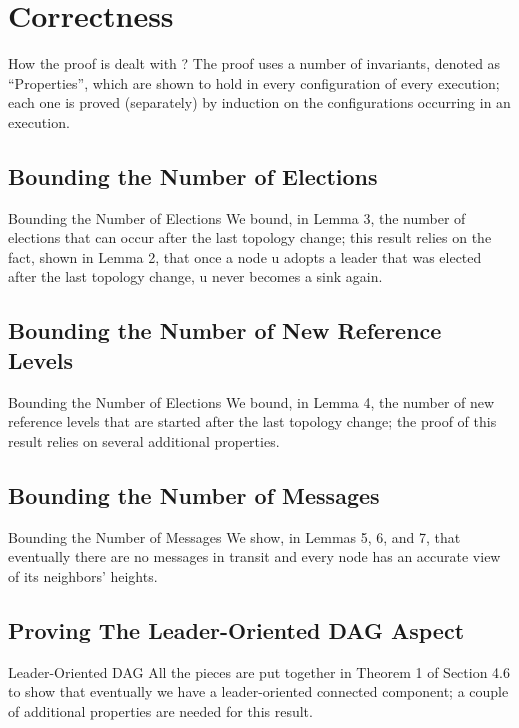 \documentclass{beamer}
\begin{document}
\section{Correctness}
\begin{frame}{How the proof is dealt with ?}
	The proof uses a number of invariants, denoted as “Properties”, which are shown to hold in every configuration of every execution; each one is proved (separately) by induction on the configurations occurring in an execution.
\end{frame}


\subsection{Bounding the Number of Elections}

\begin{frame}{Bounding the Number of Elections}
	We bound, in Lemma 3, the number of elections that can occur after the last topology change; this result relies on the fact, shown in Lemma 2, that once a node u adopts a leader that was elected after the last topology change, u never becomes a sink again.
\end{frame}

\subsection{Bounding the Number of New Reference Levels}
\begin{frame}{Bounding the Number of Elections}
We bound, in Lemma 4, the number of new reference levels that are started after the last topology change; the proof of this result relies on several additional properties.
\end{frame}
\subsection{Bounding the Number of Messages}
\begin{frame}{Bounding the Number of Messages}
We show, in Lemmas 5, 6, and 7, that eventually there are no messages in transit and every node has an accurate view of its neighbors’ heights.
\end{frame}
\subsection{Proving The Leader-Oriented DAG Aspect}
\begin{frame}{Leader-Oriented DAG}
All the pieces are put together in Theorem 1 of Section 4.6 to show that eventually we have a leader-oriented connected component; a couple of additional properties are needed for this result.
\end{frame}
\end{document}
